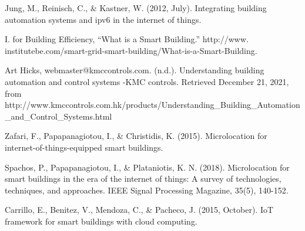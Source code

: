 \documentclass[conference]{IEEEtran}
\begin{document}
\begin{thebibliography}{00}
 Jung, M., Reinisch, C., \& Kastner, W. (2012, July). Integrating building automation systems and ipv6 in the internet of things. 


I. for Building Efficiency, “What is a Smart Building.” http://www.
institutebe.com/smart-grid-smart-building/What-is-a-Smart-Building.

Art Hicks, webmaster@kmccontrols.com. (n.d.). Understanding building automation and control systems -KMC controls. Retrieved December 21, 2021, from http://www.kmccontrols.com.hk/products/Understanding\_Building\_Automation\_and\_Control\_Systems.html 

Zafari, F., Papapanagiotou, I., \& Christidis, K. (2015). Microlocation for internet-of-things-equipped smart buildings. 

 Spachos, P., Papapanagiotou, I., \& Plataniotis, K. N. (2018). Microlocation for smart buildings in the era of the internet of things: A survey of technologies, techniques, and approaches. IEEE Signal Processing Magazine, 35(5), 140-152.

 Carrillo, E., Benitez, V., Mendoza, C., \& Pacheco, J. (2015, October). IoT framework for smart buildings with cloud computing. 

\end{thebibliography}
\end{document}
